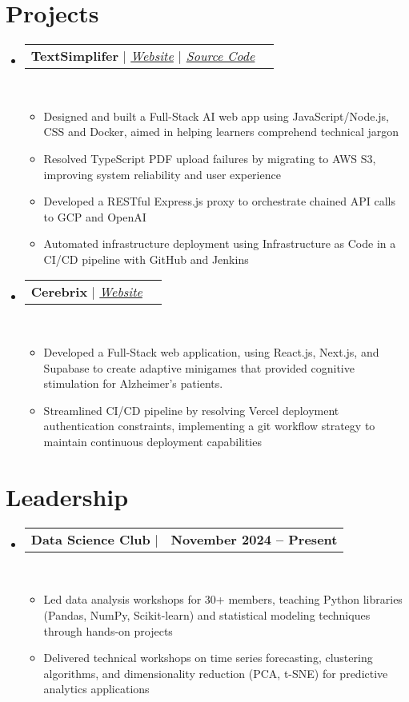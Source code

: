 \documentclass[letterpaper,11pt]{article}
\makeatletter
\newcommand{\resumeItem}[1]{
  \item\small{
    {#1 \vspace{0pt}}
  }
}
\newcommand{\resumeProjectHeading}[2]{
    \item
    \begin{tabular*}{1.001\textwidth}{l@{\extracolsep{\fill}}r}
      \small#1 & \textbf{\small #2}\\
    \end{tabular*}\vspace{-7pt}
}
\newcommand{\resumeSubHeadingListStart}{\begin{itemize}[leftmargin=0.0in, label={}]}
\newcommand{\resumeSubHeadingListEnd}{\end{itemize}}\vspace{0pt}
\newcommand{\resumeItemListStart}{\begin{itemize}}
\newcommand{\resumeItemListEnd}{\end{itemize}\vspace{-5pt}}
\makeatother
\begin{document}
\section{Projects} 
    \vspace{-5pt}
    \resumeSubHeadingListStart
    \resumeProjectHeading
            {\textbf{{TextSimplifer}} $|$ \emph{\href{https://chromewebstore.google.com/detail/text-simplifier/liffgbcejlldnajgepapdphiphpejfbd}{Website}{ $|$ }\href{}{Source Code}}}{}
            \\[5mm]
          \resumeItemListStart
            \resumeItem{Designed and built a Full-Stack AI web app using JavaScript/Node.js, CSS and Docker, aimed in helping learners comprehend technical jargon}
            \resumeItem{Resolved TypeScript PDF upload failures by migrating to AWS S3, improving system reliability and user experience}
            \resumeItem{Developed a RESTful Express.js proxy to orchestrate chained API calls to GCP and OpenAI}
            \resumeItem{Automated infrastructure deployment using Infrastructure as Code in a CI/CD pipeline with GitHub and Jenkins}
          \resumeItemListEnd
 \vspace{-20pt}
 \resumeProjectHeading
            {\textbf{{Cerebrix}} $|$ \emph{\href{https://devpost.com/software/cerebrix}{Website}}}{}
            \\[5mm]
          \resumeItemListStart
            \resumeItem{Developed a Full-Stack web application, using React.js, Next.js, and Supabase to create adaptive minigames that provided cognitive stimulation for Alzheimer's patients.}
            \resumeItem{Streamlined CI/CD pipeline by resolving Vercel deployment authentication constraints, implementing a git workflow strategy to maintain continuous deployment capabilities}
          \resumeItemListEnd
 \vspace{-17pt}

\resumeSubHeadingListEnd
\vspace{-1pt}
\section{Leadership} 
    \vspace{-5pt}
    \resumeSubHeadingListStart
                   \resumeProjectHeading
            {\textbf{{Data Science Club}} $|$\emph{{\href{}{}\href{}{}\href{}{}}}}{November 2024 -- Present}
            \\[5mm]
          \resumeItemListStart
            \resumeItem{Led data analysis workshops for 30+ members, teaching Python libraries (Pandas, NumPy, Scikit-learn) and statistical modeling techniques through hands-on projects}
            \resumeItem{Delivered technical workshops on time series forecasting, clustering algorithms, and dimensionality reduction (PCA, t-SNE) for predictive analytics applications}
          \resumeItemListEnd
          \resumeSubHeadingListEnd
 \vspace{-12pt}
\end{document}
